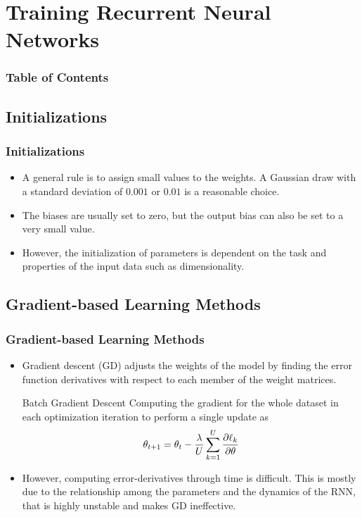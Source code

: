 \documentclass[
	11pt,
]{beamer}
\begin{document}
\section{Training Recurrent Neural Networks}
\begin{frame}
	\frametitle{Table of Contents}
	\tableofcontents[currentsection]
\end{frame}

\subsection{Initializations}

\begin{frame}
	\frametitle{Initializations}

	\begin{itemize}
		\item A general rule is to assign small values to the weights. A
		Gaussian draw with a standard deviation of $0.001$ or $0.01$ is a reasonable choice.
		\bigskip
		\item The biases are usually set to zero,
		but the output bias can also be set to a very small value.
		\bigskip
		\item However, the initialization of parameters is dependent on the
		task and properties of the input data such as dimensionality. 
	\end{itemize}

\end{frame}


\subsection{Gradient-based Learning Methods}

\begin{frame}
	\frametitle{Gradient-based Learning Methods}
	\begin{itemize}
		\item Gradient descent (GD) adjusts the
weights of the model by finding the error function derivatives with respect to each member of the weight matrices.
	
 	\bigskip %
  
        \begin{block}{Batch Gradient Descent}
		Computing the gradient for the whole dataset in each optimization iteration to perform a single update as
		\begin{equation*}
            \theta_{t+1} = \theta_t - \frac{\lambda}{U}\sum_{k=1}^U \pdv{\ell_k}{\theta}
		\end{equation*}
	\end{block}
	
 	\bigskip %

	 \item However, computing error-derivatives through time is difficult. This is mostly due to the
	 relationship among the parameters and the dynamics of the RNN, that is highly unstable and makes GD ineffective.
	\end{itemize}
\end{frame}
\end{document}
